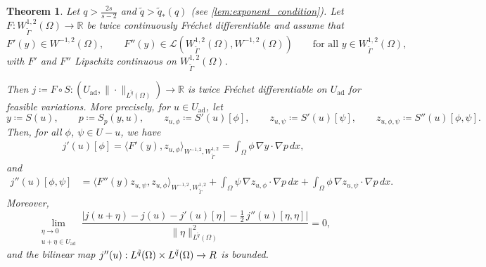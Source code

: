 \documentclass[11pt]{article}
\newcommand{\R}{\mathbb{R}}
\newcommand{\feas}{U_{\textrm{ad}}}
\newtheorem{theorem}{Theorem}[section]
\theoremstyle{definition}
\theoremstyle{remark}
\begin{document}
\begin{theorem}\label{thm:second_order}
Let $q>\frac{2s}{s-2}$ and $\tilde q>\tilde q_*(q)$ (see \cref{lem:exponent_condition}). Let $F:W^{1,2}_{\tilde\Gamma}(\Omega)\to\mathbb R$
be twice continuously Fr\'echet differentiable and assume that
\[
F'(y)\in W^{-1,2}(\Omega),
\qquad
F''(y)\in \mathcal L(W^{1,2}_{\tilde\Gamma}(\Omega),W^{-1,2}(\Omega))
\qquad
\text{for all } y\in W^{1,2}_{\tilde\Gamma}(\Omega),
\]
with $F'$ and $F''$ Lipschitz continuous on $W^{1,2}_{\tilde\Gamma}(\Omega)$.

Then $j \coloneqq F\circ S:(\feas,\|\cdot\|_{L^{\tilde q}(\Omega)})\to\mathbb R$
is twice Fr\'echet differentiable on $\feas$ for feasible variations.
More precisely, for $u\in\feas$, let
\[
y\coloneqq S(u),\qquad p\coloneqq S_p(y,u),
\qquad z_{u, \phi} \coloneqq S'(u)[\phi],\qquad z_{u, \psi}\coloneqq S'(u)[\psi],
\qquad z_{u,\phi,\psi}\coloneqq S''(u)[\phi,\psi].
\]
Then, for all $\phi$, $\psi\in U - u$, we have
\begin{align} \label{j'}
j'(u)[\phi]
=
\langle F'(y),z_{u, \phi}\rangle_{W^{-1,2},W^{1,2}_{\tilde\Gamma}}
=
\int_\Omega \phi\,\nabla y\cdot\nabla p\,dx,
\end{align}
and
\begin{align} \label{j''}
j''(u)[\phi,\psi]
&=
\langle F''(y)z_{u, \psi},z_{u, \phi}\rangle_{W^{-1,2},W^{1,2}_{\tilde\Gamma}}
+
\int_\Omega \psi\,\nabla z_{u, \phi}\cdot\nabla p\,dx
+
\int_\Omega \phi\,\nabla z_{u, \psi}\cdot\nabla p\,dx .
\end{align}
Moreover,
\[
\lim_{\substack{\eta\to 0\\ u+\eta\in\feas}}
\frac{
\bigl|j(u+\eta)-j(u)-j'(u)[\eta]-\frac12\,j''(u)[\eta,\eta]\bigr|
}{
\|\eta\|_{L^{\tilde q}(\Omega)}^2
}
=0,
\]
and the bilinear map $j''(u):L^{\tilde q}(\Omega)\times L^{\tilde q}(\Omega)\to\mathbb \R$
is bounded.
\end{theorem}
\end{document}
